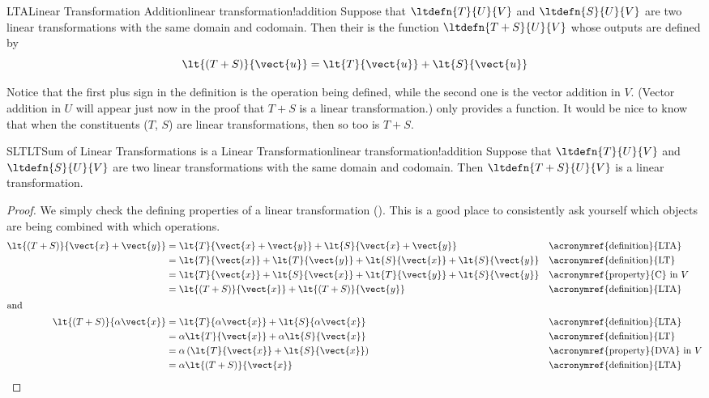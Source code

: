 %
\begin{definition}{LTA}{Linear Transformation Addition}{linear transformation!addition}
Suppose that $\ltdefn{T}{U}{V}$ and $\ltdefn{S}{U}{V}$ are two linear transformations with the same domain and codomain.  Then their  is the function $\ltdefn{T+S}{U}{V}$ whose outputs are defined by
%
\begin{equation*}
\lt{(T+S)}{\vect{u}}=\lt{T}{\vect{u}}+\lt{S}{\vect{u}}
\end{equation*}
%
\end{definition}
%
Notice that the first plus sign in the definition is the operation being defined, while the second one is the vector addition in $V$.  (Vector addition in $U$ will appear just now in the proof that $T+S$ is a linear transformation.)   only provides a function.  It would be nice to know that when the constituents ($T$, $S$) are linear transformations, then so too is $T+S$.
%
\begin{theorem}{SLTLT}{Sum of Linear Transformations is a Linear Transformation}{linear transformation!addition}
Suppose that $\ltdefn{T}{U}{V}$ and $\ltdefn{S}{U}{V}$ are two linear transformations with the same domain and codomain.  Then $\ltdefn{T+S}{U}{V}$ is a linear transformation.
\end{theorem}
%
\begin{proof}
We simply check the defining properties of a linear transformation ().  This is a good place to consistently ask yourself which objects are being combined with which operations.
%
\begin{align*}
\lt{(T+S)}{\vect{x}+\vect{y}}&=
\lt{T}{\vect{x}+\vect{y}}+\lt{S}{\vect{x}+\vect{y}}&&\text{\acronymref{definition}{LTA}}\\
&=\lt{T}{\vect{x}}+\lt{T}{\vect{y}}+\lt{S}{\vect{x}}+\lt{S}{\vect{y}}&&\text{\acronymref{definition}{LT}}\\
&=\lt{T}{\vect{x}}+\lt{S}{\vect{x}}+\lt{T}{\vect{y}}+\lt{S}{\vect{y}}&&\text{\acronymref{property}{C} in $V$}\\
&=\lt{(T+S)}{\vect{x}}+\lt{(T+S)}{\vect{y}}&&\text{\acronymref{definition}{LTA}}\\
%
\intertext{and}
%
\lt{(T+S)}{\alpha\vect{x}}&=
\lt{T}{\alpha\vect{x}}+\lt{S}{\alpha\vect{x}}&&\text{\acronymref{definition}{LTA}}\\
&=\alpha\lt{T}{\vect{x}}+\alpha\lt{S}{\vect{x}}&&\text{\acronymref{definition}{LT}}\\
&=\alpha\left(\lt{T}{\vect{x}}+\lt{S}{\vect{x}}\right)&&\text{\acronymref{property}{DVA} in $V$}\\
&=\alpha\lt{(T+S)}{\vect{x}}&&\text{\acronymref{definition}{LTA}}\\
\end{align*}
%
\end{proof}
